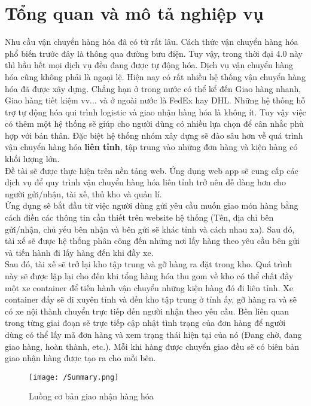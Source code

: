  \chapter{Tổng quan và mô tả nghiệp vụ}\label{chap:introduction}
	
	Nhu cầu vận chuyển hàng hóa đã có từ rất lâu. Cách thức vận chuyển hàng hóa phổ biến trước đây là thông qua đường bưu điện. Tuy vậy, trong thời đại 4.0 này thì hầu hết mọi dịch vụ đều đang được tự động hóa. Dịch vụ vận chuyển hàng hóa cũng không phải là ngoại lệ. Hiện nay có rất nhiều hệ thống vận chuyển hàng hóa đã được xây dựng. Chẳng hạn ở trong nước có thể kể đến Giao hàng nhanh, Giao hàng tiết kiệm vv... và ở ngoài nước là FedEx hay DHL. Những hệ thống hỗ trợ tự động hóa qui trình logistic và giao nhận hàng hóa là không ít. Tuy vậy việc có thêm một hệ thống sẽ giúp cho người dùng có nhiều lựa chọn để cân nhắc phù hợp với bản thân. Đặc biệt hệ thống nhóm xây dựng sẽ đào sâu hơn về quá trình vận chuyển hàng hóa
	\textbf{liên tỉnh}, tập trung vào những đơn hàng và kiện hàng có khối lượng lớn.\\
	
	Đề tài sẽ được thực hiện trên nền tảng web. Ứng dụng web app sẽ cung cấp các dịch vụ để quy trình vận chuyển hàng hóa liên tỉnh trở nên dễ dàng hơn cho người gửi/nhận, tài xế, thủ kho và quản lí.\\
	
	Ứng dụng sẽ bắt đầu từ việc người dùng gửi yêu cầu muốn giao món hàng bằng cách điền các thông tin cần thiết trên website hệ thống (Tên, địa chỉ bên gửi/nhận, chủ yếu bên nhận và bên gửi sẽ khác tỉnh và cách nhau xa). Sau đó, tài xế sẽ được hệ thống phân công đến những nơi lấy hàng theo yêu cầu bên gửi và tiến hành đi lấy hàng đến khi đầy xe.\\
	
	Sau đó, tài xế sẽ trở lại kho tập trung và gỡ hàng ra đặt trong kho. Quá trình này sẽ được lặp lại cho đến khi tổng hàng hóa thu gom về kho có thể chất đầy một xe container để tiến hành vận chuyển những kiện hàng đó đi liên tỉnh. Xe container đấy sẽ đi xuyên tỉnh và đến kho tập trung ở tỉnh ấy, gỡ hàng ra và sẽ có xe nội thành chuyển trực tiếp đến người nhận theo yêu cầu. Bên liên quan trong từng giai đoạn sẽ trực tiếp cập nhật tình trạng của đơn hàng để người dùng có thể lấy mã đơn hàng và xem trạng thái hiện tại của nó (Đang chờ, đang giao hàng, hoàn thành, etc.). Mỗi khi hàng được chuyển giao đều sẽ có biên bản giao nhận hàng được tạo ra cho mỗi bên.
	
	\begin{figure}[!ht]
		\texttt{[image: /Summary.png]}
		\centering
		\linebreak
		\caption{Luồng cơ bản giao nhận hàng hóa}
	\end{figure}
	\newpage
	
	
	\newpage
